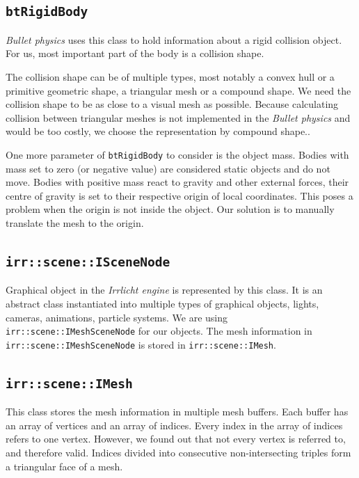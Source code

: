 \subsection*{\tt btRigidBody}
\emph{Bullet physics} uses this class to hold information about a rigid collision object. For us, most important part of the body is a collision shape. 

The collision shape can be of multiple types, most notably a convex hull or a primitive geometric shape, a triangular mesh or a compound shape. We need the collision shape to be as close to a visual mesh as possible. Because calculating collision between triangular meshes is not implemented in the \emph{Bullet physics} and would be too costly, we choose the representation by compound shape..

One more parameter of {\tt btRigidBody} to consider is the object mass. Bodies with mass set to zero (or negative value) are considered static objects and do not move. Bodies with positive mass react to gravity and other external forces, their centre of gravity is set to their respective origin of local coordinates. This poses a problem when the origin is not inside the object. Our solution is to manually translate the mesh to the origin. 

\subsection*{\tt irr::scene::ISceneNode} 
Graphical object in the \emph{Irrlicht engine} is represented by this class. It is an abstract class instantiated into multiple types of graphical objects, \eg lights, cameras, animations, particle systems. We are using {\tt irr::scene::IMeshSceneNode} for our objects. The mesh information in {\tt irr::scene::IMeshSceneNode} is stored in {\tt irr::scene::IMesh}. 

\subsection*{\tt irr::scene::IMesh} 
This class stores the mesh information in multiple mesh buffers. Each buffer has an array of vertices and an array of indices. Every index in the array of indices refers to one vertex. However, we found out that not every vertex is referred to, and therefore valid. Indices divided into consecutive non-intersecting triples form a triangular face of a mesh. 


